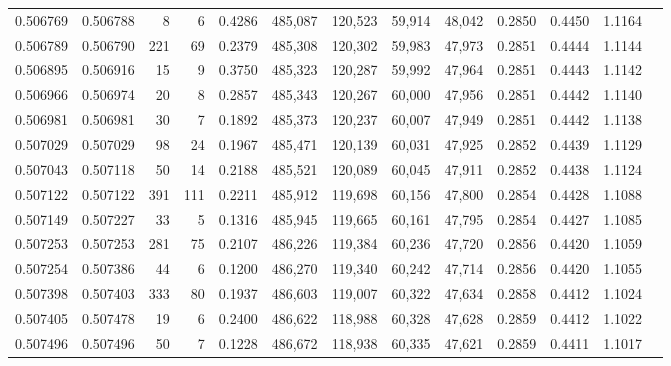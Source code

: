 \begin{tabular}{rrrrrrrrrrrrr}
0.506769 & 0.506788 &     8 &     6 &                                     0.4286 & 485,087 & 120,523 &  59,914 &  48,042 & 0.2850 & 0.4450 & 1.1164 \\
0.506789 & 0.506790 &   221 &    69 &                                     0.2379 & 485,308 & 120,302 &  59,983 &  47,973 & 0.2851 & 0.4444 & 1.1144 \\
0.506895 & 0.506916 &    15 &     9 &                                     0.3750 & 485,323 & 120,287 &  59,992 &  47,964 & 0.2851 & 0.4443 & 1.1142 \\
0.506966 & 0.506974 &    20 &     8 &                                     0.2857 & 485,343 & 120,267 &  60,000 &  47,956 & 0.2851 & 0.4442 & 1.1140 \\
0.506981 & 0.506981 &    30 &     7 &                                     0.1892 & 485,373 & 120,237 &  60,007 &  47,949 & 0.2851 & 0.4442 & 1.1138 \\
0.507029 & 0.507029 &    98 &    24 &                                     0.1967 & 485,471 & 120,139 &  60,031 &  47,925 & 0.2852 & 0.4439 & 1.1129 \\
0.507043 & 0.507118 &    50 &    14 &                                     0.2188 & 485,521 & 120,089 &  60,045 &  47,911 & 0.2852 & 0.4438 & 1.1124 \\
0.507122 & 0.507122 &   391 &   111 &                                     0.2211 & 485,912 & 119,698 &  60,156 &  47,800 & 0.2854 & 0.4428 & 1.1088 \\
0.507149 & 0.507227 &    33 &     5 &                                     0.1316 & 485,945 & 119,665 &  60,161 &  47,795 & 0.2854 & 0.4427 & 1.1085 \\
0.507253 & 0.507253 &   281 &    75 &                                     0.2107 & 486,226 & 119,384 &  60,236 &  47,720 & 0.2856 & 0.4420 & 1.1059 \\
0.507254 & 0.507386 &    44 &     6 &                                     0.1200 & 486,270 & 119,340 &  60,242 &  47,714 & 0.2856 & 0.4420 & 1.1055 \\
0.507398 & 0.507403 &   333 &    80 &                                     0.1937 & 486,603 & 119,007 &  60,322 &  47,634 & 0.2858 & 0.4412 & 1.1024 \\
0.507405 & 0.507478 &    19 &     6 &                                     0.2400 & 486,622 & 118,988 &  60,328 &  47,628 & 0.2859 & 0.4412 & 1.1022 \\
0.507496 & 0.507496 &    50 &     7 &                                     0.1228 & 486,672 & 118,938 &  60,335 &  47,621 & 0.2859 & 0.4411 & 1.1017 \\

\end{tabular}
